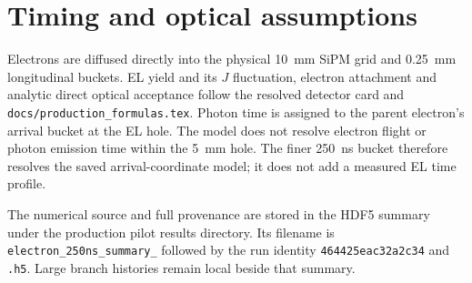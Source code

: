 \documentclass[10pt,a4paper]{article}
\begin{document}
\section*{Timing and optical assumptions}
Electrons are diffused directly into the physical 10~mm SiPM grid and
0.25~mm longitudinal buckets. EL yield and its $J$ fluctuation,
electron attachment and analytic direct optical acceptance follow the
resolved detector card and \texttt{docs/production\_formulas.tex}.
Photon time is assigned to the parent electron's arrival bucket at the EL
hole. The model does not resolve electron flight or photon emission time
within the 5~mm hole. The finer 250~ns bucket therefore resolves the saved
arrival-coordinate model; it does not add a measured EL time profile.

The numerical source and full provenance are stored in the HDF5 summary
under the production pilot results directory. Its filename is
\texttt{electron\_250ns\_summary\_} followed by the run identity
\texttt{464425eac32a2c34} and \texttt{.h5}. Large branch histories remain
local beside that summary.
\end{document}
